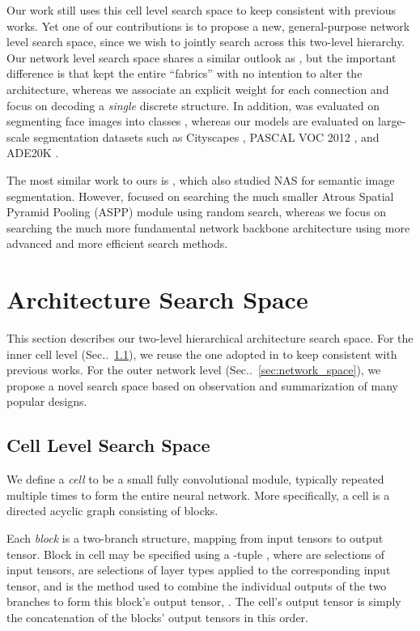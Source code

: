 \documentclass[10pt,twocolumn,letterpaper]{article}
\makeatletter
\def\@onedot{\ifx\@let@token.\else.\null\fi\xspace}
\DeclareRobustCommand\onedot{\futurelet\@let@token\@onedot}
\newcommand{\secref}[1]{Sec\onedot~\ref{#1}}
\makeatother
\begin{document}
Our work still uses this cell level search space to keep consistent with previous works. 
Yet one of our contributions is to propose a new, general-purpose network level search space, since we wish to jointly search across this two-level hierarchy.
Our network level search space shares a similar outlook as \cite{saxena2016convolutional}, but the important difference is that \cite{saxena2016convolutional} kept the entire ``fabrics'' with no intention to alter the architecture, whereas we associate an explicit weight for each connection and focus on decoding a \textit{single} discrete structure.
In addition, \cite{saxena2016convolutional} was evaluated on segmenting face images into  classes \cite{kae2013augmenting}, whereas our models are evaluated on large-scale segmentation datasets such as Cityscapes \cite{Cordts2016Cityscapes}, PASCAL VOC 2012 \cite{everingham2014pascal}, and ADE20K \cite{zhou2017scene}.

The most similar work to ours is \cite{chen2018searching}, which also studied NAS for semantic image segmentation.
However, \cite{chen2018searching} focused on searching the much smaller Atrous Spatial Pyramid Pooling (ASPP) module using random search, whereas we focus on searching the much more fundamental network backbone architecture using more advanced and more efficient search methods.  \section{Architecture Search Space}
\label{sec:space}

This section describes our two-level hierarchical architecture search space.
For the inner cell level (\secref{sec:cell_space}), we reuse the one adopted in \cite{zoph2017learning, liu2018progressive, real2018regularized, liu2018darts} to keep consistent with previous works.
For the outer network level (\secref{sec:network_space}), we propose a novel search space based on observation and summarization of many popular designs.

\subsection{Cell Level Search Space}
\label{sec:cell_space}

We define a \emph{cell} to be a small fully convolutional module, typically repeated multiple times to form the entire neural network.
More specifically, a cell is a directed acyclic graph consisting of  blocks. 

Each \emph{block} is a two-branch structure, mapping from  input tensors to  output tensor.
Block  in cell  may be specified using a -tuple , where  are selections of input tensors,  are selections of layer types applied to the corresponding input tensor, and  is the method used to combine the individual outputs of the two branches to form this block's output tensor, .
The cell's output tensor  is simply the concatenation of the blocks' output tensors  in this order.
\end{document}
